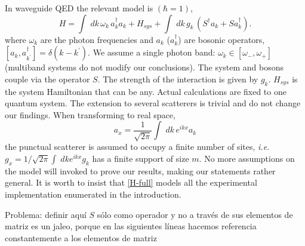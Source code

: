 \documentclass[notitlepage, prx, preprint, amsmath,superscriptaddress,amssymb]{revtex4-1}
\begin{document}
In waveguide QED the relevant model is  $(\hbar=1)$, 
\begin{equation}
H = \int \; d k  \, \omega_k \, a_k^\dagger a_k + H_{sys} + \int \; dk  \,  g_k  \, (S^\dagger a_k + S a_k^\dagger).
\label{H-full}
\end{equation}
where $\omega_k$ are the photon frequencies and $a_k$ ($a_k^\dagger$) are bosonic operators, $[a_k, a_{k^\prime}^\dagger]= \delta (k - k^\prime)$.
We assume a single photon band:  $\omega_k \in [\omega_-, \omega_+]$  (multiband systems do not modify our conclusions). 
The system and bosons couple via the operator $S$. The strength of the interaction is given by  $g_k$.   $H_{sys}$ is the system Hamiltonian that can be any.  
Actual calculations are fixed to one quantum system.  The extension to several scatterers  is trivial and do not change our findings.   When transforming to real space,
\begin{equation}
\label{axak}
a_x = \frac{1}{\sqrt{2 \pi } } \int \; d k   \, e^{i k x} a_k  
\end{equation}
the punctual scatterer is assumed to occupy a finite number of sites, \emph{i.e.} $g_x = 1/\sqrt{2 \pi } \int \; dk  e^{i k x} g_k$ has a finite support of size $m$. 
No more assumptions on the model  will  invoked to prove our results, making our statements rather general. It is worth to insist that \eqref{H-full} models all the experimental implementation enumerated in the introduction.


{\color{red}Problema: definir aquí $S$ sólo como operador y no a través de sus elementos de matriz es un jaleo, porque en las siguientes líneas hacemos referencia constantemente a los elementos de matriz}
\end{document}
